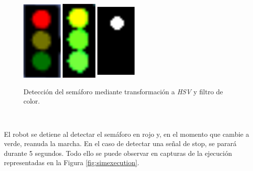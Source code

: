 \begin{figure} [h!]
	\begin{center}
		\includegraphics[width=2cm, height=4cm]{figs/cropped}\hspace{2cm}\includegraphics[width=2cm, height=4cm]{figs/hsv}\hspace{2cm}\includegraphics[width=2cm,
			height=4cm]{figs/mask}
	\end{center}
	\caption{Detección del semáforo mediante transformación a \textit{HSV} y filtro de color.}
	\label{fig:detector}
\end{figure}\

El robot se detiene al detectar el semáforo en rojo y, en el momento que cambie a verde, reanuda la marcha. En el caso de detectar una señal de stop, se parará durante 5 segundos.
Todo ello se puede observar en capturas de la ejecución representadas en la Figura \ref{fig:simexecution}.\\

